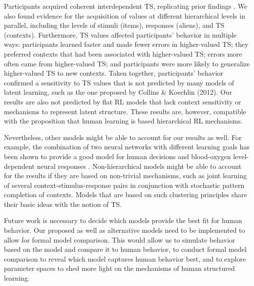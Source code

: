 \documentclass[10pt, letterpaper]{article}
\begin{document}
Participants acquired coherent interdependent TS, replicating prior findings \cite{collins_reasoning_2012, collins_cognitive_2013}. We also found evidence for the acquisition of values at different hierarchical levels in parallel, including the levels of stimuli (items), responses (aliens), and TS (contexts). Furthermore, TS values affected participants' behavior in multiple ways: participants learned faster and made fewer errors in higher-valued TS; they preferred contexts that had been associated with higher-valued TS; errors more often came from higher-valued TS; and participants were more likely to generalize higher-valued TS to new contexts. Taken together, participants' behavior confirmed a sensitivity to TS values that is not predicted by many models of latent learning, such as the one proposed by Collins \& Koechlin (2012). Our results are also not predicted by flat RL models that lack context sensitivity or mechanisms to represent latent structure. These results are, however, compatible with the proposition that human learning is based hierarchical RL mechanisms.


Nevertheless, other models might be able to account for our results as well. For example, the combination of two neural networks with different learning goals has been shown to provide a good model for human decisions and blood-oxygen level-dependent neural responses \cite{bouchacourt_hebbian_2016}. Non-hierarchical models might be able to account for the results if they are based on non-trivial mechanisms, such as joint learning of several context-stimulus-response pairs in conjunction with stochastic pattern completion of contexts. Models that are based on such clustering principles share their basic ideas with the notion of TS.

Future work is necessary to decide which models provide the best fit for human behavior. Our proposed as well as alternative models need to be implemented to allow for formal model comparison. This would allow us to simulate behavior based on the model and compare it to human behavior, to conduct formal model comparison to reveal which model captures human behavior best, and to explore parameter spaces to shed more light on the mechanisms of human structured learning. 
\end{document}
